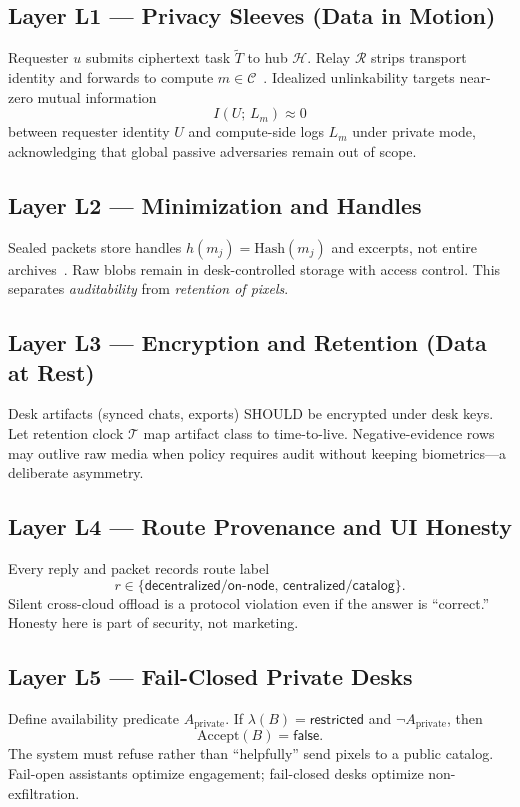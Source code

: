 \documentclass[journal,10pt,twocolumn,a4paper]{IEEEtran}
\begin{document}
\subsection{Layer L1 --- Privacy Sleeves (Data in Motion)}
Requester $u$ submits ciphertext task $\widetilde{T}$ to hub $\mathcal{H}$.
Relay $\mathcal{R}$ strips transport identity and forwards to compute $m\in\mathcal{C}$~\cite{chaum1981mix}.
Idealized unlinkability targets near-zero mutual information
\begin{equation}
I(U;\,L_m)\approx 0
\end{equation}
between requester identity $U$ and compute-side logs $L_m$ under private mode, acknowledging that global passive adversaries remain out of scope.

\subsection{Layer L2 --- Minimization and Handles}
Sealed packets store handles $h(m_j)=\mathrm{Hash}(m_j)$ and excerpts, not entire archives~\cite{benet2014ipfs}.
Raw blobs remain in desk-controlled storage with access control.
This separates \emph{auditability} from \emph{retention of pixels}.

\subsection{Layer L3 --- Encryption and Retention (Data at Rest)}
Desk artifacts (synced chats, exports) SHOULD be encrypted under desk keys.
Let retention clock $\mathcal{T}$ map artifact class to time-to-live.
Negative-evidence rows may outlive raw media when policy requires audit without keeping biometrics---a deliberate asymmetry.

\subsection{Layer L4 --- Route Provenance and UI Honesty}
Every reply and packet records route label
\begin{equation}
r\in\{\mathsf{decentralized}/\mathsf{on\text{-}node},\,\mathsf{centralized}/\mathsf{catalog}\}.
\end{equation}
Silent cross-cloud offload is a protocol violation even if the answer is ``correct.''
Honesty here is part of security, not marketing.

\subsection{Layer L5 --- Fail-Closed Private Desks}
Define availability predicate $A_{\mathrm{private}}$.
If $\lambda(B)=\mathsf{restricted}$ and $\neg A_{\mathrm{private}}$, then
\begin{equation}
\mathrm{Accept}(B)=\mathsf{false}.
\end{equation}
The system must refuse rather than ``helpfully'' send pixels to a public catalog.
Fail-open assistants optimize engagement; fail-closed desks optimize non-exfiltration.
\end{document}
